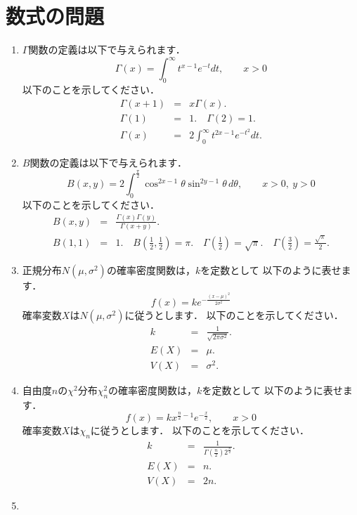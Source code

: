 \documentclass[12pt]{ltjsarticle}
\begin{document}
\section{数式の問題}
\begin{enumerate}
\item
$\Gamma$関数の定義は以下で与えられます．
\[
\Gamma\left(x\right)=\int_0^\infty t^{x-1}e^{-t}dt,\qquad
x>0
\]
以下のことを示してください．
\begin{eqnarray*}
\Gamma\left(x+1\right)&=&x\Gamma\left(x\right). \\
\Gamma\left(1\right)&=&1. \quad
\Gamma\left(2\right)=1. \\
\Gamma\left(x\right)&=&2\int_0^\infty t^{2x-1}e^{-t^2}dt.
\end{eqnarray*}
\item
$B$関数の定義は以下で与えられます．
\[
B\left(x,y\right)=2\int_0^\frac{\pi}{2}
\cos^{2x-1}\theta\sin^{2y-1}\theta\,d\theta,\qquad
x>0,\ y>0
\]
以下のことを示してください．
\begin{eqnarray*}
B\left(x,y\right)&=&
\frac{\Gamma\left(x\right)\Gamma\left(y\right)}{\Gamma\left(x+y\right)}. \\
B\left(1,1\right)&=&1. \quad
B\left(\frac{1}{2},\frac{1}{2}\right)=\pi. \quad
\Gamma\left(\frac{1}{2}\right)=\sqrt{\pi}. \quad
\Gamma\left(\frac{3}{2}\right)=\frac{\sqrt{\pi}}{2}.
\end{eqnarray*}
\item
正規分布$N\left(\mu,\sigma^2\right)$の確率密度関数は，$k$を定数として
以下のように表せます．
\[
f\left(x\right)=ke^{-\frac{\left(x-\mu\right)^2}{2\sigma^2}}
\]
確率変数$X$は$N\left(\mu,\sigma^2\right)$に従うとします．
以下のことを示してください．
\begin{eqnarray*}
k&=&\frac{1}{\sqrt{2\pi\sigma^2}}. \\
E\left(X\right)&=&\mu. \\
V\left(X\right)&=&\sigma^2.
\end{eqnarray*}
\item
自由度$n$の$\chi^2$分布$\chi_n^2$の確率密度関数は，$k$を定数として
以下のように表せます．
\[
f\left(x\right)=kx^{\frac{n}{2}-1}e^{-\frac{x}{2}},\qquad
x>0
\]
確率変数$X$は$\chi_n$に従うとします．
以下のことを示してください．
\begin{eqnarray*}
k&=&\frac{1}{\Gamma\left(\frac{n}{2}\right)2^{\frac{n}{2}}}. \\
E\left(X\right)&=&n. \\
V\left(X\right)&=&2n.
\end{eqnarray*}
\item

\end{enumerate}
\end{document}
